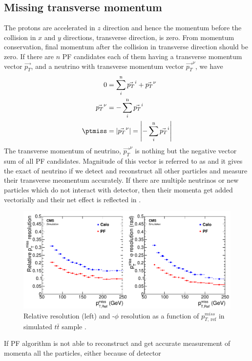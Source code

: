 \subsection{Missing transverse momentum}
The protons are accelerated in $z$ direction and hence the momentum before the collision in $x$ and $y$ directions, transverse direction, 
is zero. From momentum conservation, final momentum after the collision in transverse direction should be zero. If there are 
$n$ PF candidates each of them having a transverse momentum vector $\vec{p_{T}}$, and a neutrino with transverse momentum 
vector $\vec{p_{T}}^{\nu}$, we have
\begin{align}
0 &= \sum_{i}^{\mathrm{n}}\vec{p_{T}}^{i} + \vec{p_{T}}^{\nu} \\
\vec{p_{T}}^{\nu} &= - \sum_{i}^{\mathrm{n}}\vec{p_{T}}^{i}\\
\ptmiss &= |\vec{p_{T}}^{\nu}| = \left|- \sum_{i}^{\mathrm{n}}\vec{p_{T}}^{i}\right|
\end{align}
The transverse momentum of neutrino, $\vec{p_{T}}^{\nu}$ is nothing but the negative vector sum of all PF candidates. Magnitude of this 
vector is referred to as \ptmiss and it gives the exact \pt of neutrino if we detect and reconstruct all other particles and measure their 
transverse meomentum accurately. If there are multiple neutrinos or new particles which do not interact with detector, then their momenta 
get added vectorially and their net effect is reflected in \ptmiss.
\begin{figure}[h!]
\centering
\includegraphics[width=0.9\linewidth]{../Figures/Chap2/METresoln}
\caption[\ptmiss resolution]{Relative \ptmiss resolution (left) and \ptmiss-$\phi$ resolution as a function of $p_{T,\ \mathrm{ref}}^{miss}$ in simulated $t\bar{t}$ sample \cite{CMS-PRF-14-001}.}
\label{fig:METresoln}
\end{figure}
If PF algorithm is not able to reconstruct and get accurate measurement of momenta all the particles, either because of detector 
